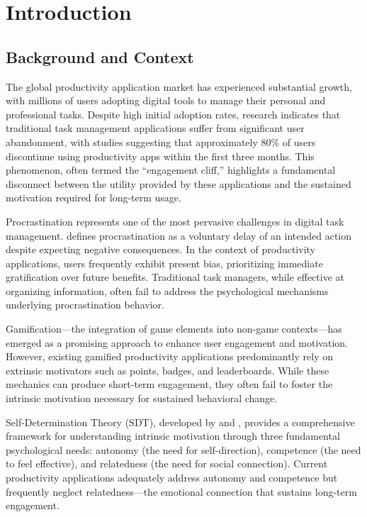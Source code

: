 
\chapter{Introduction}
\label{chap:introduction}

\section{Background and Context}
\label{sec:background}

The global productivity application market has experienced substantial growth, with millions of users adopting digital tools to manage their personal and professional tasks. Despite high initial adoption rates, research indicates that traditional task management applications suffer from significant user abandonment, with studies suggesting that approximately 80\% of users discontinue using productivity apps within the first three months. This phenomenon, often termed the ``engagement cliff,'' highlights a fundamental disconnect between the utility provided by these applications and the sustained motivation required for long-term usage.

Procrastination represents one of the most pervasive challenges in digital task management. \citet{steel2007nature} defines procrastination as a voluntary delay of an intended action despite expecting negative consequences. In the context of productivity applications, users frequently exhibit present bias, prioritizing immediate gratification over future benefits. Traditional task managers, while effective at organizing information, often fail to address the psychological mechanisms underlying procrastination behavior.

Gamification---the integration of game elements into non-game contexts---has emerged as a promising approach to enhance user engagement and motivation. However, existing gamified productivity applications predominantly rely on extrinsic motivators such as points, badges, and leaderboards. While these mechanics can produce short-term engagement, they often fail to foster the intrinsic motivation necessary for sustained behavioral change.

Self-Determination Theory (SDT), developed by \citet{deci2000amotivation} and \citet{ryan2017self}, provides a comprehensive framework for understanding intrinsic motivation through three fundamental psychological needs: autonomy (the need for self-direction), competence (the need to feel effective), and relatedness (the need for social connection). Current productivity applications adequately address autonomy and competence but frequently neglect relatedness---the emotional connection that sustains long-term engagement.

